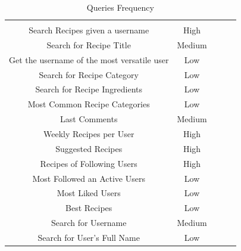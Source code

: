 \documentclass[a4paper]{report}
\begin{document}
\begin{table}[htpb]
	\centering
	\caption{Queries Frequency}
	\begin{tabular}{|c|c|lll}
		\cline{1-2}
		\cellcolor[HTML]{000000}{\color[HTML]{FFFFFF} Query} &
		\cellcolor[HTML]{000000}{\color[HTML]{FFFFFF} Frequency} &
		\multicolumn{1}{c}{\cellcolor[HTML]{FFFFFF}{\color[HTML]{FFFFFF} }} &
		&
		\\ \cline{1-2}
		Search Recipes given a username             & High   & \cellcolor[HTML]{FFFFFF} &  &  \\ \cline{1-2}
		Search for Recipe Title                     & Medium & \cellcolor[HTML]{FFFFFF} &  &  \\ \cline{1-2}
		Get the username of the most versatile user & Low    &                          &  &  \\ \cline{1-2}
		Search for Recipe Category                  & Low    &                          &  &  \\ \cline{1-2}
		Search for Recipe Ingredients               & Low    &                          &  &  \\ \cline{1-2}
		Most Common Recipe Categories               & Low    &                          &  &  \\ \cline{1-2}
		Last Comments                               & Medium &                          &  &  \\ \cline{1-2}
		Weekly Recipes per User                     & High   &                          &  &  \\ \cline{1-2}
		Suggested Recipes                           & High   &                          &  &  \\ \cline{1-2}
		Recipes of Following Users                  & High   &                          &  &  \\ \cline{1-2}
		Most Followed an Active Users               & Low    &                          &  &  \\ \cline{1-2}
		Most Liked Users                            & Low    &                          &  &  \\ \cline{1-2}
		Best Recipes                                & Low    &                          &  &  \\ \cline{1-2}
		Search for Username                         & Medium &                          &  &  \\ \cline{1-2}
		Search for User's Full Name                 & Low    &                          &  &  \\ \cline{1-2}
	\end{tabular}
\end{table}
\end{document}
